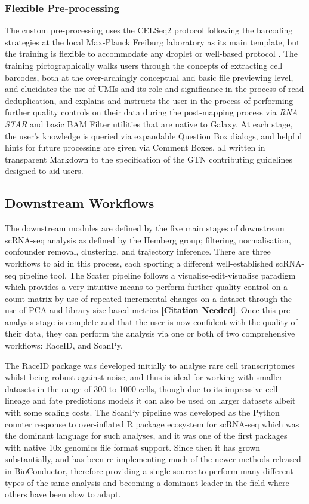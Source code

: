 \documentclass[a4paper,num-refs]{oup-contemporary}
\newcommand{\prog}[1]{\textit{#1}}
\newcommand{\citeneed}{{\bf\tiny [Citation Needed]}}
\begin{document}
\subsubsection{Flexible Pre-processing}

The custom pre-processing uses the CELSeq2 protocol following the barcoding strategies at the local Max-Planck Freiburg laboratory as its main template, but the training is flexible to accommodate any droplet or well-based protocol \citep{hashimshony2016cel}. The training pictographically walks users through the concepts of extracting cell barcodes, both at the over-archingly conceptual and basic file previewing level, and elucidates the use of UMIs and its role and significance in the process of read deduplication, and explains and instructs the user in the process of performing further quality controls on their data during the post-mapping process via \prog{RNA STAR} and basic BAM Filter utilities that are native to Galaxy. At each stage, the user's knowledge is queried via expandable Question Box dialogs, and helpful hints for future processing are given via Comment Boxes, all written in transparent Markdown to the specification of the GTN contributing guidelines designed to aid users.

\subsection{Downstream Workflows}

The downstream modules are defined by the five main stages of downstream scRNA-seq analysis as defined by the Hemberg group; filtering, normalisation, confounder removal, clustering, and trajectory inference. There are three workflows to aid in this process, each sporting a different well-established scRNA-seq pipeline tool. The Scater pipeline follows a visualise-edit-visualise paradigm which provides a very intuitive means to perform further quality control on a count matrix by use of repeated incremental changes on a dataset through the use of PCA and library size based metrics \citeneed. %
Once this pre-analysis stage is complete and that the user is now confident with the quality of their data, they can perform the analysis via one or both of two comprehensive workflows: RaceID, and ScanPy.

The RaceID package was developed initially to analyse rare cell transcriptomes whilst being robust against noise, and thus is ideal for working with smaller datasets in the range of 300 to 1000 cells, though due to its impressive cell lineage and fate predictions models it can also be used on larger datasets albeit with some scaling costs. The ScanPy pipeline was developed as the Python counter response to over-inflated R package ecosystem for scRNA-seq which was the dominant language for such analyses, and it was one of the first packages with native 10x genomics file format support. Since then it has grown substantially, and has been re-implementing much of the newer methods released in BioConductor, therefore providing a single source to perform many different types of the same analysis and becoming a dominant leader in the field where others have been slow to adapt.
\end{document}
